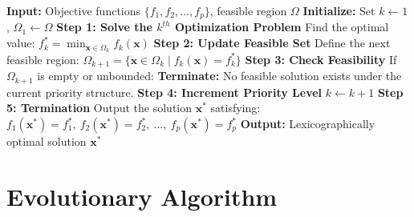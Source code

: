 \documentclass[11pt,pdflatex,sn-mathphys-ay]{sn-jnl}%
\theoremstyle{definition}
\theoremstyle{thmstyleone}%
\theoremstyle{thmstyletwo}%
\theoremstyle{thmstylethree}%
\begin{document}
\begin{appendices}
\begin{algorithm}[H]
			\begin{algorithmic}[1]
				\STATE \textbf{Input:} Objective functions $\{f_1, f_2, \dots, f_p\}$, feasible region $\Omega$
				\STATE \textbf{Initialize:} Set $k \gets 1$, $\Omega_1 \gets \Omega$
				\STATE \textbf{Step 1: Solve the $k^{th}$ Optimization Problem}
				\STATE \hspace{1em} Find the optimal value: 
				\STATE \hspace{2em} $\displaystyle f_k^* = \min_{\bm{x} \in \Omega_k} f_k(\bm{x})$
				\STATE \textbf{Step 2: Update Feasible Set}
				\STATE \hspace{1em} Define the next feasible region:
				\STATE \hspace{2em} $\Omega_{k+1} = \{ \bm{x} \in \Omega_k \mid f_k(\bm{x}) = f_k^* \}$
				\STATE \textbf{Step 3: Check Feasibility}
				\STATE \hspace{1em} If $\Omega_{k+1}$ is empty or unbounded:
				\STATE \hspace{2em} \textbf{Terminate:} No feasible solution exists under the current priority structure.
				\STATE \textbf{Step 4: Increment Priority Level}
				\STATE \hspace{1em} $k \gets k + 1$
				\ENDWHILE
				\STATE \textbf{Step 5: Termination}
				\STATE \hspace{1em} Output the solution $\bm{x}^*$ satisfying:
				\STATE \hspace{2em} $f_1(\bm{x}^*) = f_1^*, ~ f_2(\bm{x}^*) = f_2^*, ~ \dots, ~ f_p(\bm{x}^*) = f_p^*$
				\STATE \textbf{Output:} Lexicographically optimal solution $\bm{x}^*$
			\end{algorithmic}
		\end{algorithm}
		\section{Evolutionary Algorithm}
		\label{appendix:B}

\end{appendices}
\end{document}
